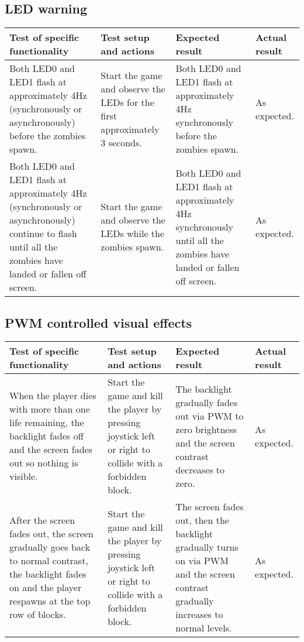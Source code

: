\documentclass[10pt, titlepage]{article}
\newenvironment{testplan}[1]
{
\newcommand{\test}[4]{\midrule ##1 & ##2 & ##3 & ##4 \\}
\subsection{#1}
\begin{longtable}{L{0.3\textwidth}L{0.2\textwidth}L{0.25\textwidth}L{0.15\textwidth}}
\toprule
\textbf{Test of specific functionality} & \textbf{Test setup and actions} & \textbf{Expected result} & \textbf{Actual result} \\
}
{
\bottomrule
\end{longtable}
}
\begin{document}
\begin{testplan}{LED warning}
\test{Both LED0 and LED1 flash at approximately 4Hz (synchronously or asynchronously) before the zombies spawn.}{Start the game and observe the LEDs for the first approximately 3 seconds.}{Both LED0 and LED1 flash at approximately 4Hz synchronously before the zombies spawn.}{As expected.}
\test{Both LED0 and LED1 flash at approximately 4Hz (synchronously or asynchronously) continue to flash until all the zombies have landed or fallen off screen.}{Start the game and observe the LEDs while the zombies spawn.}{Both LED0 and LED1 flash at approximately 4Hz synchronously until all the zombies have landed or fallen off screen.}{As expected.}
\end{testplan}

\begin{testplan}{PWM controlled visual effects}
\test{When the player dies with more than one life remaining, the backlight fades off and the screen fades out so nothing is visible.}{Start the game and kill the player by pressing joystick left or right to collide with a forbidden block.}{The backlight gradually fades out via PWM to zero brightness and the screen contrast decreases to zero.}{As expected.}
\test{After the screen fades out, the screen gradually goes back to normal contrast, the backlight fades on and the player respawns at the top row of blocks.}{Start the game and kill the player by pressing joystick left or right to collide with a forbidden block.}{The screen fades out, then the backlight gradually turns on via PWM and the screen contrast gradually increases to normal levels.}{As expected.}
\end{testplan}

%
\end{document}
